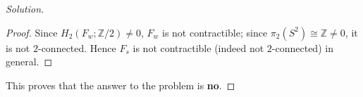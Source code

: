 \documentclass{amsart}
\theoremstyle{definition}
\newcommand{\ZZ}{\mathbb{Z}}
\begin{document}
\begin{proof}[Solution]
\begin{proof}
Since $H_2(F_w;\ZZ/2)\ne0$, $F_w$ is not contractible; since $\pi_2(S^2)\cong\ZZ\ne0$, it is
not $2$-connected. Hence $F_s$ is not contractible (indeed not $2$-connected) in general.
\end{proof}

This proves that the answer to the problem is \textbf{no}.
\end{proof}
\end{document}
